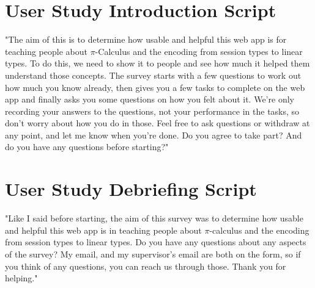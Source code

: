 \documentclass{l4proj}
\begin{document}
\begin{appendices}
\section{User Study Introduction Script}
\label{appIntro}

\quad "The aim of this is to determine how usable and helpful this web app is for teaching people about $\pi$-Calculus and the encoding from session types to linear types. To do this, we need to show it to people and see how much it helped them understand those concepts. The survey starts with a few questions to work out how much you know already, then gives you a few tasks to complete on the web app and finally asks you some questions on how you felt about it. We're only recording your answers to the questions, not your performance in the tasks, so don't worry about how you do in those. Feel free to ask questions or withdraw at any point, and let me know when you're done. Do you agree to take part? And do you have any questions before starting?"

\section{User Study Debriefing Script}
\label{appDebrief}

\quad "Like I said before starting, the aim of this survey was to determine how usable and helpful this web app is in teaching people about $\pi$-calculus and the encoding from session types to linear types. Do you have any questions about any aspects of the survey? My email, and my supervisor's email are both on the form, so if you think of any questions, you can reach us through those. Thank you for helping."

\end{appendices}






\end{document}
